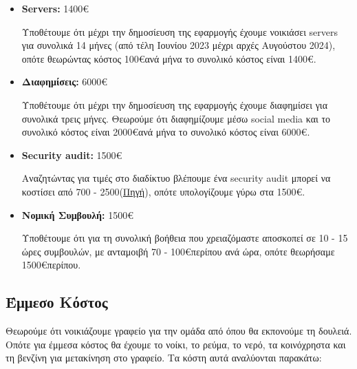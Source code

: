 \documentclass[12pt,a4paper]{article}
\begin{document}
\begin{itemize}
	\item \textbf{Servers:} 1400\euro

		Υποθέτουμε ότι μέχρι την δημοσίευση της εφαρμογής έχουμε νοικιάσει servers για συνολικά 14 μήνες (από τέλη Ιουνίου 2023 μέχρι αρχές Αυγούστου 2024), οπότε θεωρώντας κόστος 100\euro\space ανά μήνα το συνολικό κόστος είναι 1400\euro.

	\item \textbf{Διαφημίσεις:} 6000\euro

		Υποθέτουμε ότι μέχρι την δημοσίευση της εφαρμογής έχουμε διαφημίσει για συνολικά τρεις μήνες. Θεωρούμε ότι διαφημίζουμε μέσω social media και το συνολικό κόστος είναι 2000\euro\space ανά μήνα το συνολικό κόστος είναι 6000\euro.

	\item \textbf{Security audit:} 1500\euro

		Αναζητώντας για τιμές στο διαδίκτυο βλέπουμε ένα security audit μπορεί να κοστίσει από 700 - 2500\textdollar\space (\href{https://www.getastra.com/blog/security-audit/it-security-audit-cost/}{\color{blue}Πηγή}), οπότε υπολογίζουμε γύρω στα 1500\euro.

	\item \textbf{Νομική Συμβουλή:} 1500\euro

		Υποθέτουμε ότι για τη συνολική βοήθεια που χρειαζόμαστε αποσκοπεί σε 10 - 15 ώρες συμβουλών, με ανταμοιβή 70 - 100\euro\space περίπου ανά ώρα, οπότε θεωρήσαμε 1500\euro\space περίπου.
\end{itemize}

\subsection{Έμμεσο Κόστος}

Θεωρούμε ότι νοικιάζουμε γραφείο για την ομάδα από όπου θα εκπονούμε τη δουλειά. Οπότε για έμμεσα κόστος θα έχουμε το νοίκι, το ρεύμα, το νερό, τα κοινόχρηστα και τη βενζίνη για μετακίνηση στο γραφείο. Τα κόστη αυτά αναλύονται παρακάτω:
\end{document}

